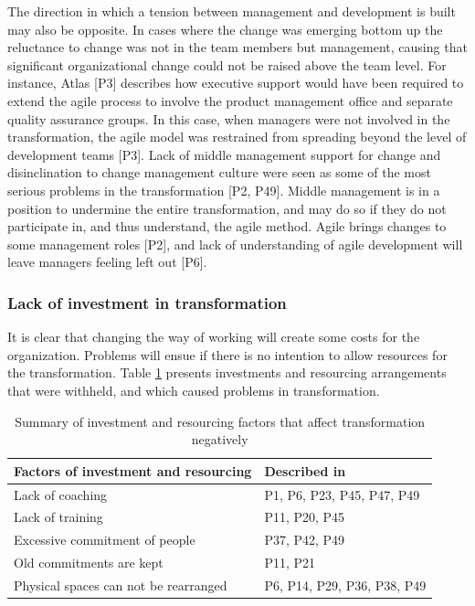\documentclass[preprint,authoryear,12pt]{elsarticle}
\begin{document}
The direction in which a tension between management and development is built may
also be opposite. In cases where the change was emerging bottom up the
reluctance to change was not in the team members but management, causing that
significant organizational change could not be raised above the team level. For
instance, Atlas [P3] describes how executive support would have been required to
extend the agile process to involve the product management office and separate
quality assurance groups. In this case, when managers %
were not involved in the transformation, the agile model was restrained from
spreading beyond the level of development teams [P3]. Lack of middle management
support for change and disinclination to change management culture were seen as
some of the most serious problems in the transformation [P2, P49]. Middle
management is in a position to undermine the entire transformation, and may do
so if they do not participate in, and thus understand, the agile method. Agile
brings changes to some management roles [P2], and lack of understanding of agile
development will leave managers feeling left out [P6].


\subsubsection{Lack of investment in transformation}

It is clear that changing the way of working will create some costs for the
organization. Problems will ensue if there is no intention to allow resources
for the transformation. Table \ref{table:challenges_lackofinvestment} presents
investments and resourcing arrangements that were withheld, and which caused
problems in transformation.

\begin{table}[h]
    \centering
    \begin{tabular}{ l l }
        \toprule
        Factors of investment and resourcing  &  Described in \\
        \midrule
        Lack of coaching                      &  P1, P6, P23, P45, P47, P49  \\
        Lack of training                      &  P11, P20, P45  \\
        Excessive commitment of people        &  P37, P42, P49  \\
        Old commitments are kept              &  P11, P21  \\
        Physical spaces can not be rearranged  &  P6, P14, P29, P36, P38, P49  \\
        \bottomrule
    \end{tabular}
    \caption{Summary of investment and resourcing factors that affect
             transformation negatively}
    \label{table:challenges_lackofinvestment}
\end{table}
\end{document}
